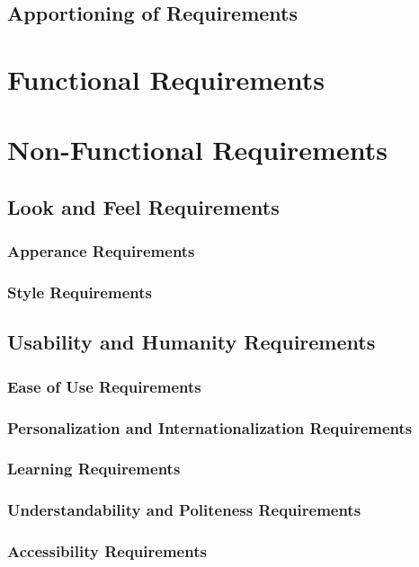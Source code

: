 \documentclass{article}
\begin{document}
\subsection{Apportioning of Requirements}

\section{Functional Requirements}

\section{Non-Functional Requirements}

\subsection{Look and Feel Requirements}
\subsubsection{Apperance Requirements}
\subsubsection{Style Requirements}

\subsection{Usability and Humanity Requirements}
\subsubsection{Ease of Use Requirements}
\subsubsection{Personalization and Internationalization Requirements}
\subsubsection{Learning Requirements}
\subsubsection{Understandability and Politeness Requirements}
\subsubsection{Accessibility Requirements}
\end{document}
